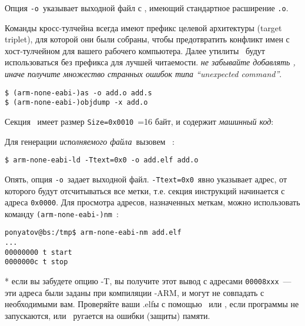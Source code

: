 Опция \verb|-o|\ указывает выходной файл с , имеющий стандартное расширение \verb|.o|.

\begin{framed}
\noindent Команды кросс-тулчейна всегда имеют префикс целевой архитектуры
(target triplet), для которой они были собраны, чтобы предотвратить
конфликт имен с хост-тулчейном для вашего рабочего компьютера. Далее утилиты
\gnut\ будут использоваться без префикса для лучшей читаемости. \emph{не
забывайте добавлять , иначе получите множество странных
ошибок типа ``unexpected command''}.
\end{framed}

\begin{verbatim}
$ (arm-none-eabi-)as -o add.o add.s
$ (arm-none-eabi-)objdump -x add.o
\end{verbatim}

Секция \ имеет размер \verb|Size=0x0010|\ =16 байт, и содержит
\emph{машинный код}:


\bigskip
Для генерации \emph{исполняемого файла}\ вызовем \ :

\begin{verbatim}
$ arm-none-eabi-ld -Ttext=0x0 -o add.elf add.o
\end{verbatim}

Опять, опция \verb|-o|\ задает выходной файл. \verb|-Ttext=0x0|\ явно указывает
адрес, от которого будут отсчитываться все метки, т.е. секция инструкций
начинается с адреса \verb|0x0000|. Для просмотра адресов, назначенных меткам,
можно использовать команду \verb|(arm-none-eabi-)nm|\ :

\begin{verbatim}
ponyatov@bs:/tmp$ arm-none-eabi-nm add.elf
...
00000000 t start
0000000c t stop
\end{verbatim}
* если вы забудете опцию -T, вы получите этот вывод с адресами \verb|00008xxx|\
--- эти адреса были заданы при компиляции \gnut-ARM, и могут не совпадать
с необходимыми вам. Проверяйте ваши .elfы с помощью \prog{nm}\ или
\prog{objdump}, если программы не запускаются, или \qemu\ ругается на ошибки
(защиты) памяти.
\bigskip

